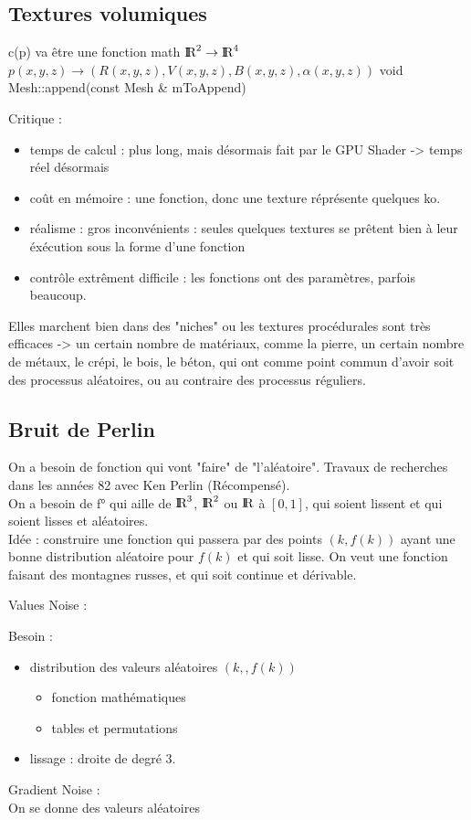 \documentclass[11pt]{article}
\def\R{\textrm{I\kern-0.21emR}}
\begin{document}
\subsection{Textures volumiques}
c(p) va être une fonction math $\R^2 \rightarrow \R^4$\\ $p(x, y, z) \rightarrow (R(x, y, z), V(x, y, z), B(x, y, z), \alpha (x, y, z))$
void Mesh::append(const Mesh & mToAppend) {

Critique : \\
\begin{itemize}
	\item temps de calcul : plus long, mais désormais fait par le GPU Shader -> temps réel désormais
	\item coût en mémoire : une fonction, donc une texture réprésente quelques ko.
	\item réalisme : gros inconvénients : seules quelques textures se prêtent bien à leur éxécution sous la forme d'une fonction
	\item contrôle extrêment difficile : les fonctions ont des paramètres, parfois beaucoup.
\end{itemize}
Elles marchent bien dans des "niches" ou les textures procédurales sont très efficaces -> un certain nombre de matériaux, comme la pierre, un certain nombre de métaux, le crépi, le bois, le béton, qui ont comme point commun d'avoir soit des processus aléatoires, ou au contraire des processus réguliers.

\subsection{Bruit de Perlin}
On a besoin de fonction qui vont "faire" de "l'aléatoire". Travaux de recherches dans les années 82 avec Ken Perlin (Récompensé).\\
On a besoin de f° qui aille de $\R^3$, $\R^2$ ou $\R$ à $[0, 1]$, qui soient lissent et qui soient lisses et aléatoires.\\

Idée : construire une fonction qui passera par des points $(k, f(k))$ ayant une bonne distribution aléatoire pour $f(k)$ et qui soit lisse. On veut une fonction faisant des montagnes russes, et qui soit continue et dérivable.

Values Noise :

Besoin : \\
\begin{itemize}
	\item distribution des valeurs aléatoires $(k, , f(k))$ \\
		\begin{itemize}
			\item fonction mathématiques
			\item tables et permutations
		\end{itemize}
	\item lissage : droite de degré 3.
\end{itemize}
\vskip 1cm
Gradient Noise :\\
On se donne des valeurs aléatoires


}
\end{document}
